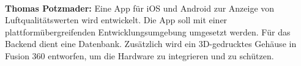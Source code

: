 \begin{inhalt}
\bigskip \\

\textbf{Thomas Potzmader:}
Eine App für iOS und Android zur Anzeige von Luftqualitätswerten wird entwickelt. Die App soll mit einer plattformübergreifenden Entwicklungsumgebung umgesetzt werden. Für das Backend dient eine Datenbank. Zusätzlich wird ein 3D-gedrucktes Gehäuse in Fusion 360 entworfen, um die Hardware zu integrieren und zu schützen.





\end{inhalt}